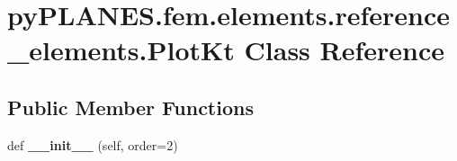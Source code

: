 \hypertarget{classpy_p_l_a_n_e_s_1_1fem_1_1elements_1_1reference__elements_1_1_plot_kt}{}\section{py\+P\+L\+A\+N\+E\+S.\+fem.\+elements.\+reference\+\_\+elements.\+Plot\+Kt Class Reference}
\label{classpy_p_l_a_n_e_s_1_1fem_1_1elements_1_1reference__elements_1_1_plot_kt}
\subsection*{Public Member Functions}
\begin{DoxyCompactItemize}
\item 
\mbox{\label{classpy_p_l_a_n_e_s_1_1fem_1_1elements_1_1reference__elements_1_1_plot_kt_a13ca5f9aeda97e45841bd77b454b58c4}} 
def {\bfseries \+\_\+\+\_\+init\+\_\+\+\_\+} (self, order=2)
\end{DoxyCompactItemize}
